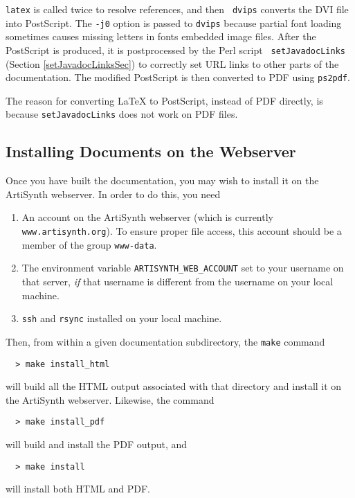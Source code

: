 \documentclass{article}
\begin{document}
{\tt latex} is called twice to resolve references, and then {\tt
dvips} converts the DVI file into PostScript. The {\tt -j0} option is
passed to {\tt dvips} because partial font loading sometimes causes
missing letters in fonts embedded image files.  After the PostScript
is produced, it is postprocessed by the Perl script {\tt
setJavadocLinks} (Section \ref{setJavadocLinksSec}) to correctly set
URL links to other parts of the documentation. The modified PostScript
is then converted to PDF using {\tt ps2pdf}.

\begin{sideblock}
The reason for converting LaTeX to PostScript, instead of PDF directly, is because
{\tt setJavadocLinks} does not work on PDF files.
\end{sideblock}

\subsection{Installing Documents on the Webserver}
\label{InstallingSec}

Once you have built the documentation, you may wish to install it on the
ArtiSynth webserver. In order to do this, you need

\begin{enumerate}
\item An account on the ArtiSynth webserver (which is currently {\tt
www.artisynth.org}). To ensure proper file access, this account
should be a member of the group {\tt www-data}.
\item The environment variable {\tt ARTISYNTH\_WEB\_ACCOUNT} set to
your username on that server, {\it if} that username is different
from the username on your local machine.
\item {\tt ssh} and {\tt rsync} installed on your local machine.
\end{enumerate}

Then, from within a given documentation subdirectory, the {\tt make}
command
%
\begin {verbatim}
  > make install_html
\end{verbatim}
%
will build all the HTML output associated with that directory and install
it on the ArtiSynth webserver. Likewise, the command
%
\begin {verbatim}
  > make install_pdf
\end{verbatim}
%
will build and install the PDF output, and
%
\begin {verbatim}
  > make install
\end{verbatim}
%
will install both HTML and PDF.
\end{document}
